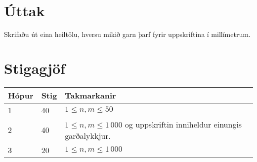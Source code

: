 \section*{Úttak}
Skrifaðu út eina heiltölu, hversu mikið garn þarf fyrir uppskriftina í millímetrum.

\section*{Stigagjöf}
\begin{tabular}{|l|l|l|}
\hline
Hópur & Stig & Takmarkanir \\ \hline
1     & 40   & $1 \leq n, m \leq 50$ \\ \hline
2     & 40   & $1 \leq n, m \leq 1\,000$ og uppskriftin inniheldur einungis garðalykkjur. \\ \hline
3     & 20   & $1 \leq n, m \leq 1\,000$ \\ \hline
\end{tabular}

